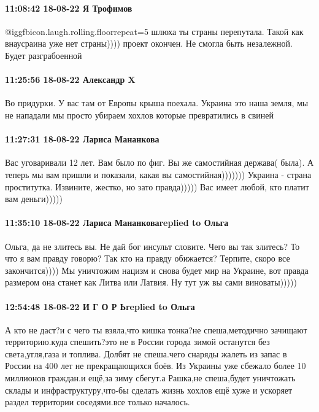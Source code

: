 \paragraph{11:08:42 18-08-22 Я Трофимов}

 @igg{fbicon.laugh.rolling.floor}{repeat=5} шлюха ты страны перепутала. Такой как внаусраина уже нет страны))))
проект окончен. Не смогла быть незалежной. Будет разграбоенной

\paragraph{11:25:56 18-08-22 Александр X}

Во придурки. У вас там от Европы крыша поехала. Украина это наша земля, мы не
нападали мы просто убираем хохлов которые превратились в свиней

\paragraph{11:27:31 18-08-22 Лариса Мананкова}

Вас уговаривали 12 лет. Вам было по фиг. Вы же самостийная держава( была). А
теперь мы вам пришли и показали, какая вы самостийная))))))) Украина - страна
проститутка. Извините, жестко, но зато правда))))) Вас имеет любой, кто платит
вам деньги)))))

\paragraph{11:35:10 18-08-22 Лариса Мананковаreplied to Ольга}

Ольга, да не злитесь вы. Не дай бог инсульт словите. Чего вы так злитесь? То
что я вам правду говорю? Так кто на правду обижается? Терпите, скоро все
закончится)))) Мы уничтожим нацизм и снова будет мир на Украине, вот правда
размером она станет как Литва или Латвия. Ну тут уж вы сами виноваты)))))

\paragraph{12:54:48 18-08-22 И Г О Р Ьreplied to Ольга}

А кто не даст?и с чего ты взяла,что кишка тонка?не спеша,методично зачищают
территорию.куда спешить?это не в России города зимой останутся без
света,угля,газа и топлива. Долбят не спеша.чего снаряды жалеть из запас в
России на 400 лет не прекращающихся боёв. Из Украины уже сбежало более 10
миллионов граждан.и ещё,за зиму сбегут.а Рашка,не спеша,будет уничтожать склады
и инфраструктуру,что-бы сделать жизнь хохлов ещё хуже и ускоряет раздел
территории соседями.все только началось.
